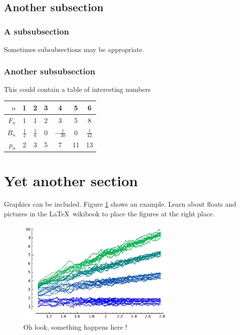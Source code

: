 \documentclass{uonmathreport}
\begin{document}
\subsection{Another subsection} \label{subsec:application}

\subsubsection{A subsubsection} \label{subsubsec:red}

Sometimes subsubsections may be appropriate.

\subsubsection{Another subsubsection} \label{subsubsec:green}



This could contain a table of interesting numbers
\begin{center}
  \begin{tabular}{r|cccccc}
    $n$   & 1 & 2 & 3 & 4 & 5 & 6 \\ \hline
    $F_n$ & 1 & 1 & 2 & 3 & 5 & 8 \\
    $B_n$ & $\tfrac{1}{2}$ & $\tfrac{1}{6}$ & 0 & $-\tfrac{1}{30}$ & 0 &  $\tfrac{1}{42}$ \\
    $p_n$ & 2 & 3& 5& 7 & 11 & 13 \\
  \end{tabular}
\end{center}

\section{Yet another section} \label{sec:my2}

Graphics can be included. Figure \ref{fig:bsd} shows an example.
Learn about floats and pictures in the \LaTeX\ wikibook to place
the figures at the right place.
%
\begin{figure}
 \begin{center}
   \includegraphics[width=0.7\textwidth]{bsd.jpg}
 \end{center}
 \caption{Oh look, something happens here !}
 \label{fig:bsd}
\end{figure}
\end{document}
